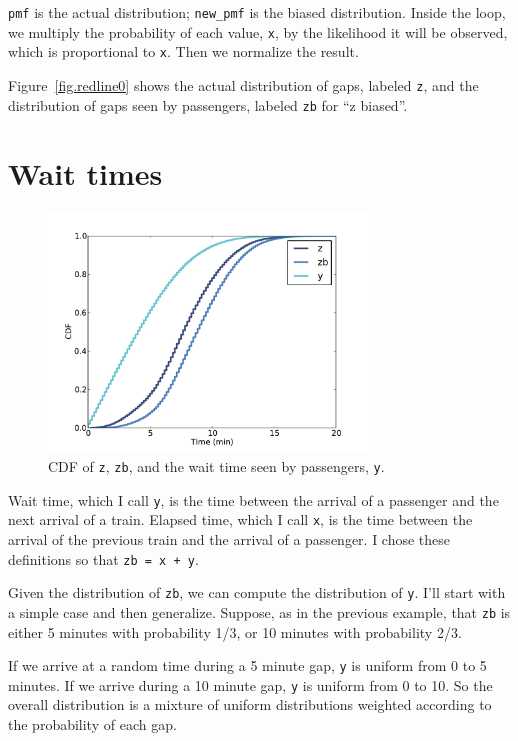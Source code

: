 \documentclass[12pt]{book}
\theoremstyle{exercise}
\begin{document}
{\tt pmf} is the actual distribution; \verb"new_pmf" is the
biased distribution.  Inside the loop, we multiply the
probability of each value, {\tt x}, by the likelihood it will
be observed, which is proportional to {\tt x}.  Then we
normalize the result.

Figure~\ref{fig.redline0} shows the actual distribution of gaps,
labeled {\tt z}, and the distribution of gaps seen by passengers,
labeled {\tt zb} for ``z biased''.


\section{Wait times}

\begin{figure}
\centerline{\includegraphics[height=2.5in]{figs/redline2.pdf}}
\caption{CDF of {\tt z}, {\tt zb}, and the wait time seen
by passengers, {\tt y}. }
\label{fig.redline2}
\end{figure}

Wait time, which I call {\tt y}, is the time between the arrival
of a passenger and the next arrival of a train.  Elapsed time, which I
call {\tt x}, is the time between the arrival of the previous
train and the arrival of a passenger.  I chose these definitions
so that {\tt zb = x + y}.

Given the distribution of {\tt zb}, we can compute the distribution of
{\tt y}.  I'll start with a simple case and then generalize.
Suppose, as in the previous example, that {\tt zb} is either 5 minutes
with probability 1/3, or 10 minutes with probability 2/3.

If we arrive at a random time during a 5 minute gap, 
{\tt y} is uniform from 0 to 5 minutes.  If we arrive during a 10
minute gap, {\tt y} is uniform from 0 to 10.  So the overall
distribution is a mixture of uniform distributions weighted
according to the probability of each gap.
\end{document}
